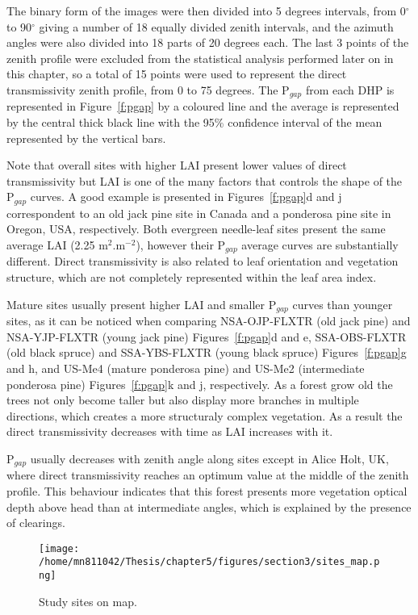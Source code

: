\documentclass[a4paper,11pt]{report}
\begin{document}
The binary form of the images were then divided into 5 degrees intervals, from 0$^{\circ}$ to 90$^{\circ}$ giving a number of 18 equally divided zenith intervals, and the azimuth angles were also divided into 18 parts of 20 degrees each. The last 3 points of the zenith profile were excluded from the statistical analysis performed later on in this chapter, so a total of 15 points were used to represent the direct transmissivity zenith profile, from 0 to 75 degrees. The P$_{gap}$ from each DHP is represented in Figure~\ref{f:pgap} by a coloured line and the average is represented by the central thick black line with the 95\% confidence interval of the mean represented by the vertical bars. 

Note that overall sites with higher LAI present lower values of direct transmissivity but LAI is one of the many factors that controls the shape of the P$_{gap}$ curves. A good example is presented in Figures~\ref{f:pgap}d and j correspondent to an old jack pine site in Canada and a ponderosa pine site in Oregon, USA, respectively. Both evergreen needle-leaf sites present the same average LAI (2.25 m$^2$.m$^{-2}$), however their P$_{gap}$ average curves are substantially different. Direct transmissivity is also related to leaf orientation and vegetation structure, which are not completely represented within the leaf area index.

Mature sites usually present higher LAI and smaller P$_{gap}$ curves than younger sites, as it can be noticed when comparing NSA-OJP-FLXTR (old jack pine) and NSA-YJP-FLXTR (young jack pine) Figures~\ref{f:pgap}d and e, SSA-OBS-FLXTR (old black spruce) and SSA-YBS-FLXTR (young black spruce) Figures~\ref{f:pgap}g and h, and US-Me4 (mature ponderosa pine) and US-Me2 (intermediate ponderosa pine) Figures~\ref{f:pgap}k and j, respectively. As a forest grow old the trees not only become taller but also display more branches in multiple directions, which creates a more structuraly complex vegetation. As a result the direct transmissivity decreases with time as LAI increases with it. 

P$_{gap}$ usually decreases with zenith angle along sites except in Alice Holt, UK, where direct transmissivity reaches an optimum value at the middle of the zenith profile. This behaviour indicates that this forest presents more vegetation optical depth above head than at intermediate angles, which is explained by the presence of clearings.


\begin{figure}[ht!]
\centering
\texttt{[image: /home/mn811042/Thesis/chapter5/figures/section3/sites\_map.png]}
\caption{Study sites on map.} 
\label{f:studysites}
\end{figure}
\end{document}
